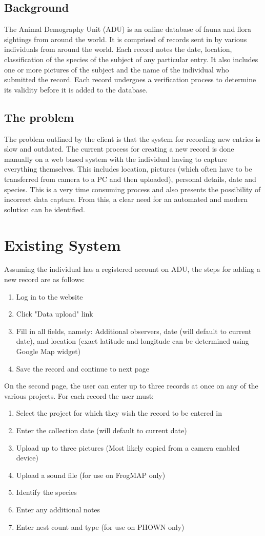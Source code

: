 \documentclass[
10pt, %
a4paper, %
oneside, %
headinclude,footinclude, %
BCOR5mm, %
]{scrartcl}
\begin{document}
\subsection{Background}
The Animal Demography Unit (ADU) is an online database of fauna and flora sightings from around the world. It is comprised of records sent in by various individuals from around the world. Each record notes the date, location, classification of the species of the subject of any particular entry. It also includes one or more pictures of the subject and the name of the individual who submitted the record. Each record undergoes a verification process to determine its validity before it is added to the database.
\subsection{The problem}
The problem outlined by the client is that the system for recording new entries is slow and outdated. The current process for creating a new record is done manually on a web based system with the individual having to capture everything themselves. This includes location, pictures (which often have to be transferred from camera to a PC and then uploaded), personal details, date and species. This is a very time consuming process and also presents the possibility of incorrect data capture. From this, a clear need for an automated and modern solution can be identified.   

\section{Existing System}
Assuming the individual has a registered account on ADU, the steps for adding  a new record are as follows:
\begin{enumerate}
\item Log in to the website
\item Click "Data upload" link
\item Fill in all fields, namely: Additional observers, date (will default to current date), and location (exact latitude and longitude can be determined using Google Map widget)
\item Save the record and continue to next page
\end{enumerate}
On the second page, the user can enter up to three records at once on any of the various projects. For each record the user must:
\begin{enumerate}
\item Select the project for which they wish the record to be entered in
\item Enter the collection date (will default to current date)
\item Upload up to three pictures (Most likely copied from a camera enabled device)
\item Upload a sound file (for use on FrogMAP only)
\item Identify the species
\item Enter any additional notes
\item Enter nest count and type (for use on PHOWN only)
\end{enumerate}
\end{document}
